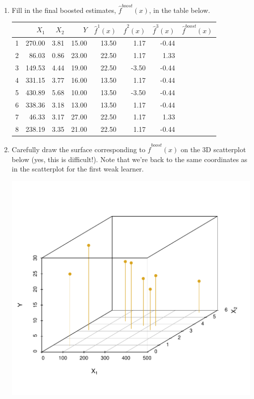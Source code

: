 \documentclass{article}\usepackage[]{graphicx}\usepackage[]{color}
\begin{document}
\begin{enumerate}
\item Fill in the final boosted estimates, $\hat{f}^{boost}(x)$, in the table below.

\vspace{10mm}

\begin{tabular}{rrrrrrrl}
  \hline
 & $X_1$ & $X_2$ & $Y$ & $\hat{f}^1(x)$ & $\hat{f}^2(x)$ & $\hat{f}^3(x)$ & $\hat{f}^{boost}(x)$ \\ 
  \hline
1 & 270.00 & 3.81 & 15.00 & 13.50 & 1.17 & -0.44 &  \\ 
  2 & 86.03 & 0.86 & 23.00 & 22.50 & 1.17 & 1.33 &  \\ 
  3 & 149.53 & 4.44 & 19.00 & 22.50 & -3.50 & -0.44 &  \\ 
  4 & 331.15 & 3.77 & 16.00 & 13.50 & 1.17 & -0.44 &  \\ 
  5 & 430.89 & 5.68 & 10.00 & 13.50 & -3.50 & -0.44 &  \\ 
  6 & 338.36 & 3.18 & 13.00 & 13.50 & 1.17 & -0.44 &  \\ 
  7 & 46.33 & 3.17 & 27.00 & 22.50 & 1.17 & 1.33 &  \\ 
  8 & 238.19 & 3.35 & 21.00 & 22.50 & 1.17 & -0.44 &  \\ 
   \hline
\end{tabular}


\vspace{8mm}
\item Carefully draw the surface corresponding to $\hat{f}^{boost}(x)$ on the 3D scatterplot below (yes, this is difficult!). Note that we're back to the same coordinates as in the scatterplot for the first weak learner.

\vspace{-8mm}

\begin{center}
{\includegraphics[scale=0.9]{scatterD.pdf}}
\end{center}



\end{enumerate}
\end{document}

